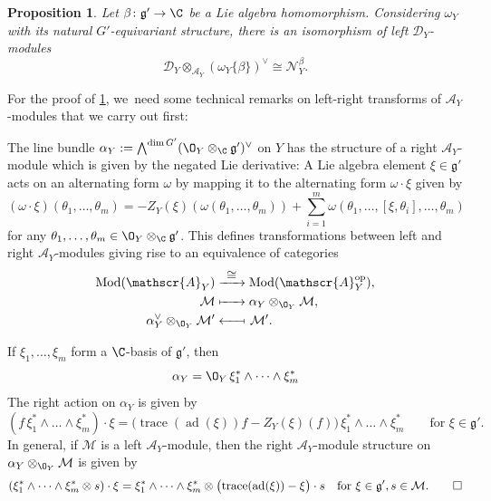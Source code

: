 \documentclass[JEP,XML,SOM,Unicode,published]{cedram}
\newcommand{\To}[1]{\mathchoice{\xrightarrow{\textstyle\kern4pt#1\kern3pt}}{\xrightarrow{\,#1\,}}{}{}}
\newcommand\Mto[1]{\mathrel{\mapstochar\To{#1}}}
\newcommand{\From}[1]{\mathchoice{\xleftarrow{\textstyle~#1~}}{\xleftarrow{\,#1\,}}{}{}}
\newcommand\Mfrom[1]{\mathrel{\From{#1}\joinrel\mapstochar}}
\newtheorem{prop}[thm]{Proposition}
\newcommand{\cA}{\mathscr{A}}
\newcommand{\frg}{\mathfrak{g}}
\DeclareMathOperator{\ad}{ad}
\DeclareMathOperator{\trace}{trace}
\begin{document}
\begin{prop} \label{prop:interpretationOfNBeta}
Let $\beta \colon \frg' \to \C$ be a Lie algebra homomorphism. Considering $\omega_Y$ with its natural $G'$-equivariant structure, there is an isomorphism of left $\mathscr{D}_Y$\nobreakdash-mod\-ules
\[
\mathscr{D}_Y \otimes_{\cA_Y} (\omega_Y\{\beta\})^\vee \cong \mathscr{N}_{Y}^{\beta}.
\]
\end{prop}

For the proof of \cref{prop:interpretationOfNBeta}, we~need some technical remarks on left-right transforms of $\cA_Y$\nobreakdash-mod\-ules that we carry out first:

The line bundle $\alpha_Y := \bigwedge^{\dim G'} (\O_Y \otimes_\C \frg')^\vee$ on $Y$ has the structure of a right $\cA_Y$\nobreakdash-mod\-ule which is given by the negated Lie derivative: A Lie algebra element $\xi \in \frg'$ acts on an alternating form $\omega$ by mapping it to the alternating form $\omega \cdot \xi$ given by
\[
(\omega \cdot \xi)(\theta_1,\dots,\theta_m) = -Z_Y(\xi)(\omega(\theta_1,\dots,\theta_m)) + \sum_{i=1}^m \omega(\theta_1,\dots,[\xi,\theta_i],\dots,\theta_m)
\]
for any $\theta_1,\dots,\theta_m \in \O_Y \otimes_\C \frg'$. This defines transformations between left and right $\cA_Y$\nobreakdash-mod\-ules giving rise to an equivalence of categories
\begin{align*}
\operatorname{Mod}(\cA_Y) &\To{\cong} \operatorname{Mod}(\cA_Y^{\text{op}}), \\
\mathcal M &\Mto{\hphantom{\cong}} \alpha_Y \otimes_{\O_Y} \mathcal M, \\
\alpha_Y^\vee \otimes_{\O_Y} \mathcal M' &\Mfrom{\hphantom{\cong}}\; \mathcal M'.
\end{align*}

\begin{rmk} \label{rem:explicitLeftRightTransform}
If $\xi_1,\dots,\xi_m$ form a $\C$-basis of $\frg'$, then
\[
\alpha_Y = \O_Y \, \xi_1^* \wedge \dots \wedge \xi_m^*
\]
The right action on $\alpha_Y$ is given by
\[
(f\, \xi_1^* \wedge \dots \wedge \xi_m^*) \cdot \xi = \big(\!\trace(\ad(\xi))f-Z_Y(\xi)(f)\big) \, \xi_1^* \wedge \dots \wedge \xi_m^* \qquad \text{for } \xi \in \frg'.
\]
In general, if $\mathcal M$ is a left $\cA_Y$\nobreakdash-mod\-ule, then the right $\cA_Y$\nobreakdash-mod\-ule structure on $\alpha_Y \otimes_{\O_Y} \mathcal M$ is given by
\[
(\xi_1^* \wedge \dots \wedge \xi_m^* \otimes s) \cdot \xi = \xi_1^* \wedge \dots \wedge \xi_m^* \otimes \big(\!\trace(\ad(\xi))-\xi\big) \cdot s \quad \text{for } \xi \in \frg', s \in \mathcal M.\qedhere
\]
\end{rmk}
\end{document}
